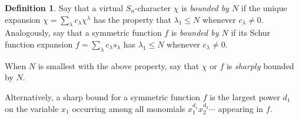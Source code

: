 \documentclass[12pt]{amsart}
\theoremstyle{plain}
\theoremstyle{definition}
\newtheorem{defn}[thm]{Definition}
\begin{document}
\begin{defn}
Say that a virtual $S_n$-character $\chi$ 
is {\it bounded by $N$} if the unique
expansion $\chi = \sum_{\lambda} c_\lambda \chi^\lambda$ has
the property that $\lambda_1 \leq N$ whenever $c_\lambda \neq 0$.
Analogously, say that a symmetric function $f$
is {\it bounded by $N$} if its Schur function expansion
$f=\sum_\lambda c_\lambda s_\lambda$ has 
$\lambda_1 \leq N$ whenever $c_\lambda \neq 0$.

When $N$ is smallest with the above property, say that
$\chi$ or $f$ is {\it sharply} bounded by $N$.

Alternatively, a sharp bound for a symmetric function 
$f$ is the largest power $d_1$ on the variable $x_1$ 
occurring among all 
monomials $x_1^{d_1} x_2^{d_2} \cdots$ appearing in $f$.
\end{defn}
\end{document}
